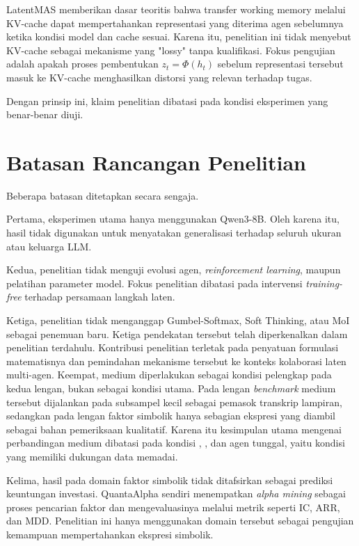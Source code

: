LatentMAS memberikan dasar teoritis bahwa transfer working memory melalui KV-cache dapat mempertahankan representasi yang diterima agen sebelumnya ketika kondisi model dan cache sesuai. Karena itu, penelitian ini tidak menyebut KV-cache sebagai mekanisme yang "lossy" tanpa kualifikasi. Fokus pengujian adalah apakah proses pembentukan \(z_t=\Phi(h_t)\) sebelum representasi tersebut masuk ke KV-cache menghasilkan distorsi yang relevan terhadap tugas.

Dengan prinsip ini, klaim penelitian dibatasi pada kondisi eksperimen yang benar-benar diuji.

\section{Batasan Rancangan Penelitian}

Beberapa batasan ditetapkan secara sengaja.

Pertama, eksperimen utama hanya menggunakan Qwen3-8B. Oleh karena itu, hasil tidak digunakan untuk menyatakan generalisasi terhadap seluruh ukuran atau keluarga LLM.

Kedua, penelitian tidak menguji evolusi agen, \textit{reinforcement learning}, maupun pelatihan parameter model. Fokus penelitian dibatasi pada intervensi \textit{training-free} terhadap persamaan langkah laten.

Ketiga, penelitian tidak menganggap Gumbel-Softmax, Soft Thinking, atau MoI sebagai penemuan baru. Ketiga pendekatan tersebut telah diperkenalkan dalam penelitian terdahulu. Kontribusi penelitian terletak pada penyatuan formulasi matematisnya dan pemindahan mekanisme tersebut ke konteks kolaborasi laten multi-agen.
Keempat, medium  diperlakukan sebagai kondisi pelengkap
pada kedua lengan, bukan sebagai kondisi utama. Pada lengan \textit{benchmark}
medium tersebut dijalankan pada subsampel kecil sebagai pemasok transkrip
lampiran, sedangkan pada lengan faktor simbolik hanya sebagian ekspresi yang
diambil sebagai bahan pemeriksaan kualitatif. Karena itu kesimpulan utama
mengenai perbandingan medium dibatasi pada kondisi , , dan
agen tunggal, yaitu kondisi yang memiliki dukungan data memadai.

Kelima, hasil pada domain faktor simbolik tidak ditafsirkan sebagai prediksi keuntungan investasi. QuantaAlpha sendiri menempatkan \textit{alpha mining} sebagai proses pencarian faktor dan mengevaluasinya melalui metrik seperti IC, ARR, dan MDD. Penelitian ini hanya menggunakan domain tersebut sebagai pengujian kemampuan mempertahankan ekspresi simbolik.

